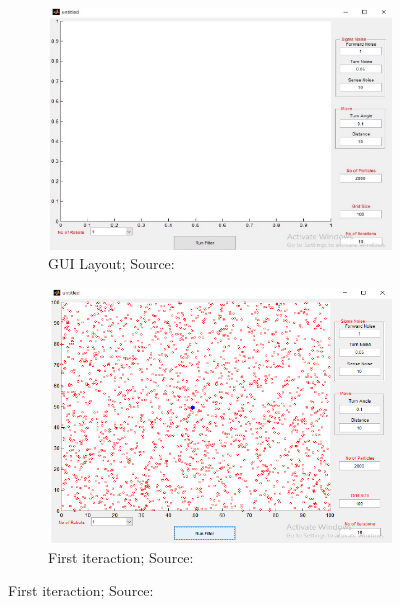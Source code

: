 \begin{figure}[H]
    \centering
    \begin{subfigure}{0.49\textwidth}
        \includegraphics[width=\textwidth]{figures/gui_layout_mcl_1.png}
        \caption[GUI Layout]{GUI Layout; Source: \citet{sushant2017localization}}
    \end{subfigure}
    \hfill
    \begin{subfigure}{0.49\textwidth}
        \includegraphics[width=\textwidth]{figures/gui_layout_mcl_2.png}
        \caption[First iteraction]{First iteraction; Source: \citet{sushant2017localization}}
    \end{subfigure}


\end{figure}
